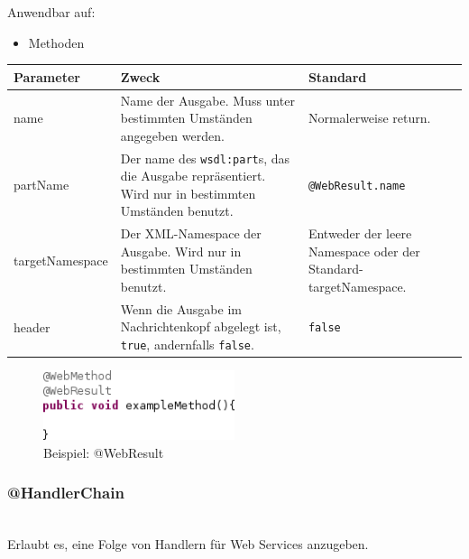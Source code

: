 \documentclass[runningheads]{llncs}
\newcommand{\germanquote}[1]{\glqq{}#1\grqq{}}
\newcommand{\anntabwidth}{\textwidth}
\begin{document}
      \noindent{}Anwendbar auf:
      \begin{itemize}
       \item Methoden\vfill
      \end{itemize}
    \begin{tabulary}{\anntabwidth}{|l|L|L|}
    \hline
    \textbf{Parameter} & \textbf{Zweck} & \textbf{Standard} \\
    \hline
      name &
      Name der Ausgabe. Muss unter bestimmten Umständen angegeben werden. &
      Normalerweise \germanquote{return}. \\
    \hline
      partName &
      Der name des \texttt{wsdl:part}s, das die Ausgabe repräsentiert. Wird nur in bestimmten
      Umständen benutzt. &
      \texttt{@WebResult.name} \\
    \hline
      targetNamespace &
      Der XML-Namespace der Ausgabe. Wird nur in bestimmten Umständen benutzt. &
      Entweder der leere Namespace oder der Standard-targetNamespace. \\
    \hline
      header &
      Wenn die Ausgabe im Nachrichtenkopf abgelegt ist, \texttt{true}, andernfalls \texttt{false}.&
      \texttt{false} \\
    \hline
    \end{tabulary} \vfill
    \begin{figure}[tbh]
      \centering
      \includegraphics[width=0.5\textwidth]{../images/AtWebResult.png}
      \caption{Beispiel: @WebResult}
      \label{fig:wr}
    \end{figure} \vfill

    \subsubsection{@HandlerChain}\ \\
      Erlaubt es, eine Folge von Handlern für Web Services anzugeben.
\end{document}
